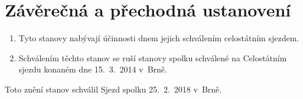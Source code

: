 \documentclass[a4paper]{article}
\begin{document}
\section{Závěrečná a přechodná ustanovení}
    \begin{enumerate}
    \item Tyto stanovy nabývají účinnosti dnem jejich schválením celostátním sjezdem.

    \item Schválením těchto stanov se ruší stanovy spolku schválené na
        Celostátním sjezdu konaném dne 15.~3.~2014 v~Brně.

    \end{enumerate}

Toto znění stanov schválil Sjezd spolku 25.~2.~2018 v~Brně.
\end{document}
